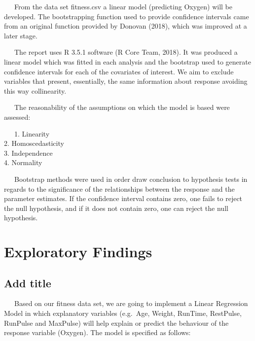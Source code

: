 \documentclass[]{article}
\begin{document}
~~~From the data set fitness.csv a linear model (predicting Oxygen) will
be developed. The bootstrapping function used to provide confidence
intervals came from an original function provided by Donovan (2018),
which was improved at a later stage.

~~~The report uses R 3.5.1 software (R Core Team, 2018). It was produced
a linear model which was fitted in each analysis and the bootstrap used
to generate confidence intervals for each of the covariates of interest.
We aim to exclude variables that present, essentially, the same
information about response avoiding this way collinearity.

~~~The reasonability of the assumptions on which the model is based were
assessed:

~~~1. Linearity\\
\hspace*{0.333em}\hspace*{0.333em}\hspace*{0.333em}2. Homoscedasticity\\
\hspace*{0.333em}\hspace*{0.333em}\hspace*{0.333em}3. Independence\\
\hspace*{0.333em}\hspace*{0.333em}\hspace*{0.333em}4. Normality

~~~Bootstrap methods were used in order draw conclusion to hypothesis
tests in regards to the significance of the relationships between the
response and the parameter estimates. If the confidence interval
contains zero, one fails to reject the null hypothesis, and if it does
not contain zero, one can reject the null hypothesis.

\section{Exploratory Findings}\label{exploratory-findings}

\subsection{Add title}\label{add-title}

~~~Based on our fitness data set, we are going to implement a Linear
Regression Model in which explanatory variables (e.g.~Age, Weight,
RunTime, RestPulse, RunPulse and MaxPulse) will help explain or predict
the behaviour of the response variable (Oxygen). The model is specified
as follows:
\end{document}

